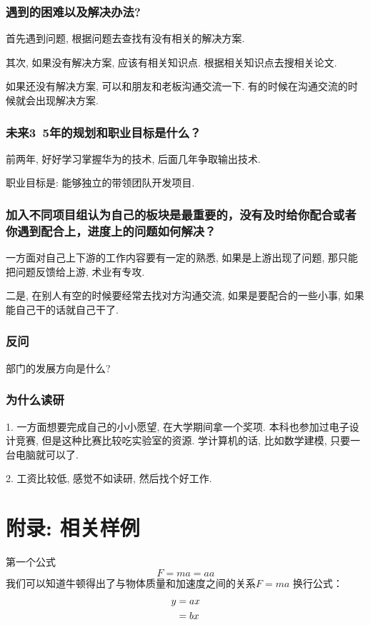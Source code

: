 \documentclass[UTF8]{ctexart}
\begin{document}
\subsubsection{遇到的困难以及解决办法?}
首先遇到问题, 根据问题去查找有没有相关的解决方案. 

其次, 如果没有解决方案, 应该有相关知识点. 根据相关知识点去搜相关论文. 

如果还没有解决方案, 可以和朋友和老板沟通交流一下. 有的时候在沟通交流的时候就会出现解决方案.

\subsubsection{未来3~5年的规划和职业目标是什么？}

前两年, 好好学习掌握华为的技术, 后面几年争取输出技术.

职业目标是: 能够独立的带领团队开发项目. 

\subsubsection{加入不同项目组认为自己的板块是最重要的，没有及时给你配合或者你遇到配合上，进度上的问题如何解决？}

一方面对自己上下游的工作内容要有一定的熟悉, 如果是上游出现了问题, 那只能把问题反馈给上游, 术业有专攻. 

二是, 在别人有空的时候要经常去找对方沟通交流, 如果是要配合的一些小事, 如果能自己干的话就自己干了.

\subsubsection{反问}

部门的发展方向是什么?


\subsubsection{为什么读研}
1. 一方面想要完成自己的小小愿望, 在大学期间拿一个奖项. 本科也参加过电子设计竞赛, 但是这种比赛比较吃实验室的资源. 学计算机的话, 比如数学建模, 只要一台电脑就可以了. 

2. 工资比较低, 感觉不如读研, 然后找个好工作.


	\section{附录: 相关样例}
	第一个公式
	\begin{equation}
		F=ma=aa
	\end{equation}
	我们可以知道牛顿得出了与物体质量和加速度之间的关系$F=ma$
	换行公式：
	\begin{align}
		y &=ax\notag\\
		&=bx
	\end{align}
	
\end{document}

